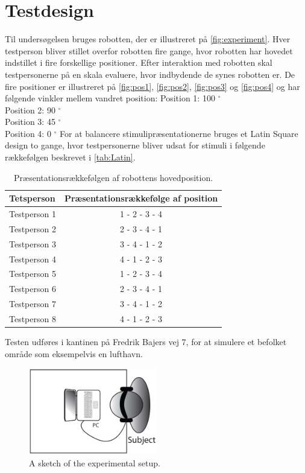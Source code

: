 \section*{Testdesign}
%
Til undersøgelsen bruges robotten, der er illustreret på \autoref{fig:experiment}. Hver testperson bliver stillet overfor robotten fire gange, hvor robotten har hovedet indstillet i fire forskellige positioner. Efter interaktion med robotten skal testpersonerne på en skala evaluere, hvor indbydende de synes robotten er. De fire positioner er illustreret på \autoref{fig:pos1}, \autoref{fig:pos2}, \autoref{fig:pos3} og \autoref{fig:pos4} og har følgende vinkler mellem vandret position:\blankline
%
Position 1: 100 $^{\circ}$\\
Position 2: 90 $^{\circ}$\\
Position 3: 45 $^{\circ}$\\
Position 4: 0 $^{\circ}$\blankline
%
For at balancere stimulipræsentationerne bruges et Latin Square design to gange, hvor testpersonerne bliver udsat for stimuli i følgende rækkefølgen beskrevet i \autoref{tab:Latin}.\blankline
%
\begin{table}[H]
	\centering
	\begin{tabular}{l|c}
		Tetsperson     & Præsentationsrækkefølge af position \\\hline
		Testperson 1   & 1 - 2 - 3 - 4          \\\hline
		Testperson 2   & 2 - 3 - 4 - 1          \\\hline
		Testperson 3   & 3 - 4 - 1 - 2          \\\hline
		Testperson 4   & 4 - 1 - 2 - 3          \\\hline
		Testperson 5   & 1 - 2 - 3 - 4          \\\hline
		Testperson 6   & 2 - 3 - 4 - 1          \\\hline
		Testperson 7   & 3 - 4 - 1 - 2          \\\hline
		Testperson 8   & 4 - 1 - 2 - 3   
	\end{tabular}
	\caption{Præsentationsrækkefølgen af robottens hovedposition.}
	\label{tab:Latin}         
\end{table}
\noindent
%
Testen udføres i kantinen på Fredrik Bajers vej 7, for at simulere et befolket område som eksempelvis en lufthavn. 



%
\begin{figure}[H]
\centering
\includegraphics[width = 0.5\textwidth]{Figure/experiment.png} 
\caption{A sketch of the experimental setup.}
\label{fig:experiment}
\end{figure}
%
